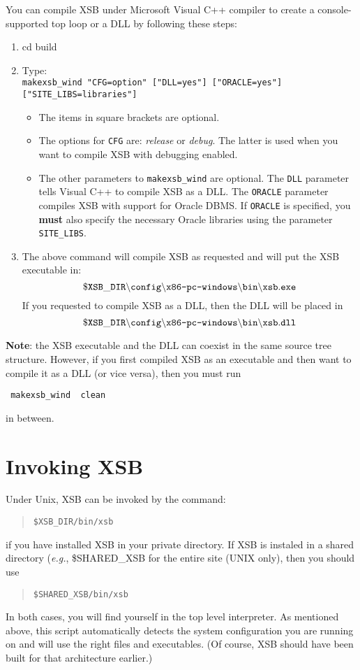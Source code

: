 You can compile XSB under Microsoft Visual C++ compiler 
to create a console-supported top loop or a DLL by following
these steps:

\begin{enumerate}

\item
   cd build

\item
  Type:\\
  {\tt makexsb\_wind "CFG=option" ["DLL=yes"] ["ORACLE=yes"] ["SITE\_LIBS=libraries"]}
  \begin{itemize}
  \item The items in square brackets are optional.
  \item The options for {\tt CFG} are: \emph{release} or \emph{debug}.  The
    latter is used when you want to compile XSB with debugging enabled.
  \item The other parameters to {\tt makexsb\_wind} are optional. The {\tt DLL}
    parameter tells Visual C++ to compile XSB as a DLL. The {\tt ORACLE}
    parameter compiles XSB with support for Oracle DBMS. If {\tt ORACLE} is
    specified, you {\bf must} also specify the necessary Oracle libraries
    using the parameter {\tt SITE\_LIBS}.
  \end{itemize}
   
 \item The above command will compile XSB as requested and will put the XSB 
   executable in:
\[
 \tt
 \$XSB\_DIR\backslash config\backslash \mbox{\tt x86-pc-windows}\backslash bin
 \backslash xsb.exe
\]
   If you requested to compile XSB as a DLL, then the DLL will be placed in
\[
 \tt
 \$XSB\_DIR\backslash config\backslash \mbox{\tt x86-pc-windows}\backslash
 bin \backslash xsb.dll
\]
\end{enumerate}
{\bf Note}: the XSB executable and the DLL can coexist in the same source
tree structure. However, if you first compiled  XSB as an executable and
then want to compile it as a DLL (or vice versa), then you must run 
\begin{verbatim}
 makexsb_wind  clean  
\end{verbatim}
in between.


\section{Invoking XSB}

Under Unix, XSB can be invoked by the command:
\begin{quote}
       \tt \$XSB\_DIR/bin/xsb
\end{quote}
if you have installed XSB in your private directory.
If XSB is instaled in a shared directory ({\it e.g.}, \$SHARED\_XSB
for the entire site (UNIX only), then you should use
\begin{quote}
       \tt \$SHARED\_XSB/bin/xsb
\end{quote}
In both cases, you will find yourself in the top level interpreter.  
As mentioned above, this script automatically detects the system
configuration you are running on and will use the right files and
executables. (Of course, XSB should have been built for that architecture
earlier.)

